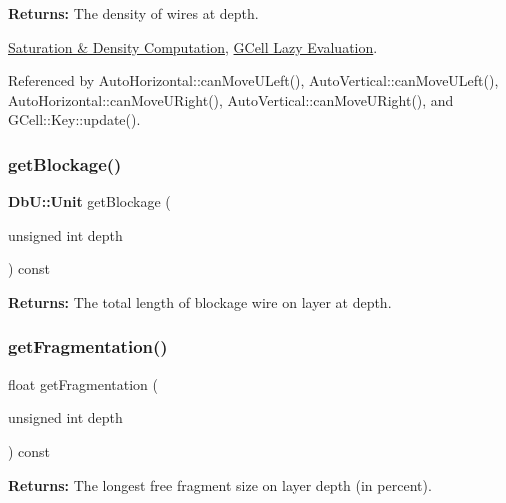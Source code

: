 {\bfseries Returns\+:} The density of wires at {\ttfamily depth}.

\hyperlink{classKatabatic_1_1GCell_secGCellDensity}{Saturation \& Density Computation}, \hyperlink{classKatabatic_1_1GCell_secGCellLazyEvaluation}{G\+Cell Lazy Evaluation}. 

Referenced by Auto\+Horizontal\+::can\+Move\+U\+Left(), Auto\+Vertical\+::can\+Move\+U\+Left(), Auto\+Horizontal\+::can\+Move\+U\+Right(), Auto\+Vertical\+::can\+Move\+U\+Right(), and G\+Cell\+::\+Key\+::update().

\mbox{\label{classKatabatic_1_1GCell_ab37ffda5a2e1ba60931d32c29237bd33}} 
\subsubsection{\texorpdfstring{get\+Blockage()}{getBlockage()}}
{\footnotesize\ttfamily \textbf{ Db\+U\+::\+Unit} get\+Blockage (\begin{DoxyParamCaption}\item[{unsigned int}]{depth }\end{DoxyParamCaption}) const\hspace{0.3cm}{\ttfamily [inline]}}

{\bfseries Returns\+:} The total length of blockage wire on layer at {\ttfamily depth}. \mbox{\label{classKatabatic_1_1GCell_a44ec8d16030b5900bd0ccc02652b727f}} 
\subsubsection{\texorpdfstring{get\+Fragmentation()}{getFragmentation()}}
{\footnotesize\ttfamily float get\+Fragmentation (\begin{DoxyParamCaption}\item[{unsigned int}]{depth }\end{DoxyParamCaption}) const\hspace{0.3cm}{\ttfamily [inline]}}

{\bfseries Returns\+:} The longest free fragment size on layer {\ttfamily depth} (in percent). 

